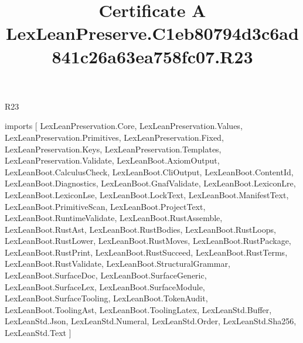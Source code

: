 \begin{lexlean}{R23}
\title{Certificate A LexLeanPreserve.C1eb80794d3c6ad841c26a63ea758fc07.R23}
\begin{coremodule}
imports [
  LexLeanPreservation.Core,
  LexLeanPreservation.Values,
  LexLeanPreservation.Primitives,
  LexLeanPreservation.Fixed,
  LexLeanPreservation.Keys,
  LexLeanPreservation.Templates,
  LexLeanPreservation.Validate,
  LexLeanBoot.AxiomOutput,
  LexLeanBoot.CalculusCheck,
  LexLeanBoot.CliOutput,
  LexLeanBoot.ContentId,
  LexLeanBoot.Diagnostics,
  LexLeanBoot.GnafValidate,
  LexLeanBoot.LexiconLre,
  LexLeanBoot.LexiconLse,
  LexLeanBoot.LockText,
  LexLeanBoot.ManifestText,
  LexLeanBoot.PrimitiveScan,
  LexLeanBoot.ProjectText,
  LexLeanBoot.RuntimeValidate,
  LexLeanBoot.RustAssemble,
  LexLeanBoot.RustAst,
  LexLeanBoot.RustBodies,
  LexLeanBoot.RustLoops,
  LexLeanBoot.RustLower,
  LexLeanBoot.RustMoves,
  LexLeanBoot.RustPackage,
  LexLeanBoot.RustPrint,
  LexLeanBoot.RustSucceed,
  LexLeanBoot.RustTerms,
  LexLeanBoot.RustValidate,
  LexLeanBoot.StructuralGrammar,
  LexLeanBoot.SurfaceDoc,
  LexLeanBoot.SurfaceGeneric,
  LexLeanBoot.SurfaceLex,
  LexLeanBoot.SurfaceModule,
  LexLeanBoot.SurfaceTooling,
  LexLeanBoot.TokenAudit,
  LexLeanBoot.ToolingAst,
  LexLeanBoot.ToolingLatex,
  LexLeanStd.Buffer,
  LexLeanStd.Json,
  LexLeanStd.Numeral,
  LexLeanStd.Order,
  LexLeanStd.Sha256,
  LexLeanStd.Text
]


\end{coremodule}
\end{lexlean}
